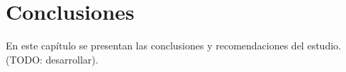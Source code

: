 
\chapter{Conclusiones}

\label{cap:conclusiones}

En este capítulo se presentan las conclusiones y recomendaciones del
estudio. (TODO: desarrollar).



